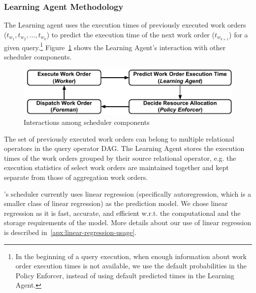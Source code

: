 \subsubsection{Learning Agent Methodology}
The Learning agent uses the execution times of previously executed work orders\\
($t_{w_{1}}, t_{w_{2}}, \ldots, t_{w_{k}}$) to predict the execution time of 
the next work order ($t_{w_{k+1}}$) for a given query.\footnote{In the beginning of a query execution, when enough information about work order execution times is not available, we use the default probabilities in the Policy Enforcer, instead of using default predicted times in the Learning Agent.}
Figure~\ref{fig:scheduler-cycle} shows the Learning Agent's interaction with other scheduler components.

\begin{figure}[]
	\centering
	\includegraphics[width=\linewidth]{policy/figures/Compact-SchedulerCycle.pdf}
	\vspace{-1.5em}
	\caption{Interactions among scheduler components}
	\label{fig:scheduler-cycle}
	\vspace{-1.5em}
\end{figure}

The set of previously executed work orders can belong to multiple relational operators in the query operator DAG. 
The Learning Agent stores the execution times of the work orders grouped by their source relational operator, e.g. the execution statistics of select work orders are maintained together and kept separate from those of aggregation work orders. 

\sys{}'s scheduler currently uses linear regression (specifically autoregression, which is a smaller class of linear regression) as the prediction model.
We chose linear regression as it is fast, accurate, and efficient w.r.t. the computational and the storage requirements of the model. 
More details about our use of linear regression is described in~\ref{apx:linear-regression-usage}.

